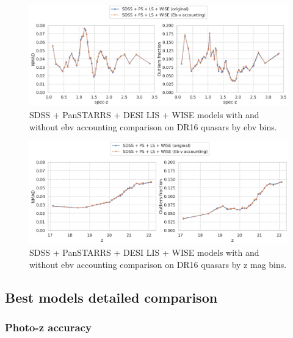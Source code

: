 \begin{figure}
    \centering
    \includegraphics[width=\linewidth]{images/ebv-35-zspec.png}
    \caption{SDSS + PanSTARRS + DESI LIS + WISE models with and without ebv accounting comparison on DR16 quasars by ebv bins.}
    \label{fig:ebv_35_ebv}
\end{figure}

\begin{figure}
    \centering
    \includegraphics[width=\linewidth]{images/ebv-35-z.png}
    \caption{SDSS + PanSTARRS + DESI LIS + WISE models with and without ebv accounting comparison on DR16 quasars by z mag bins.}
    \label{fig:ebv_35_z}
\end{figure}

\subsection{Best models detailed comparison}




\subsubsection{Photo-z accuracy}

